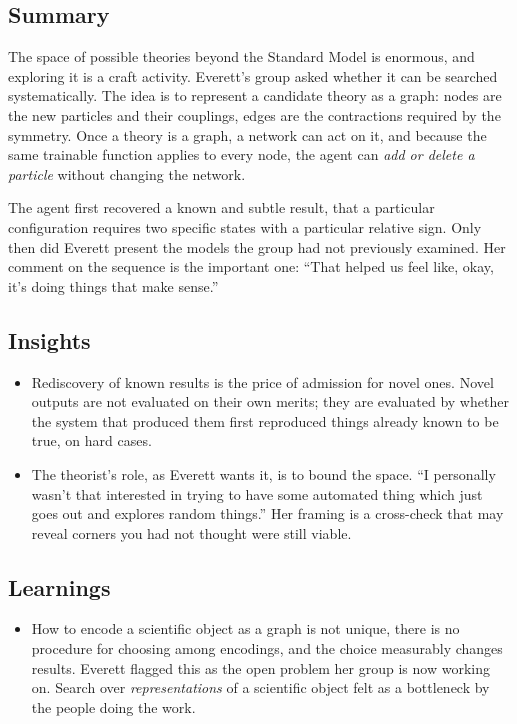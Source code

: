 \documentclass[11pt]{article}
\begin{document}
\subsection*{Summary}
The space of possible theories beyond the Standard Model is enormous, and exploring it is a craft activity. Everett's group asked whether it can be searched systematically. The idea is to represent a candidate theory as a graph: nodes are the new particles and their couplings, edges are the contractions required by the symmetry. Once a theory is a graph, a network can act on it, and because the same trainable function applies to every node, the agent can \emph{add or delete a particle} without changing the network.

The agent first recovered a known and subtle result, that a particular configuration requires two specific states with a particular relative sign. Only then did Everett present the models the group had not previously examined. Her comment on the sequence is the important one: ``That helped us feel like, okay, it's doing things that make sense.''

\subsection*{Insights}
\begin{itemize}
    \item Rediscovery of known results is the price of admission for novel ones. Novel outputs are not evaluated on their own merits; they are evaluated by whether the system that produced them first reproduced things already known to be true, on hard cases.
    \item The theorist's role, as Everett wants it, is to bound the space. ``I personally wasn't that interested in trying to have some automated thing which just goes out and explores random things.'' Her framing is a cross-check that may reveal corners you had not thought were still viable.
\end{itemize}

\subsection*{Learnings}
\begin{itemize}
    \item How to encode a scientific object as a graph is not unique, there is no procedure for choosing among encodings, and the choice measurably changes results. Everett flagged this as the open problem her group is now working on. Search over \emph{representations} of a scientific object felt as a bottleneck by the people doing the work.
\end{itemize}
\end{document}
